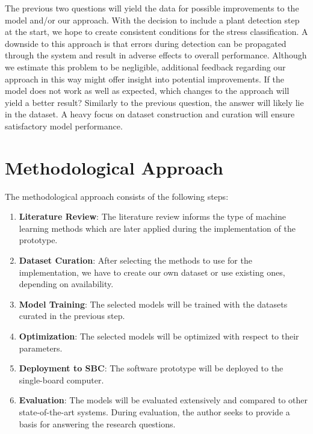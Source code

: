 \documentclass[draft,final]{vutinfth} %
\begin{document}
\begin{enumerate}
  The previous two questions will yield the data for possible
  improvements to the model and/or our approach. With the decision to
  include a plant detection step at the start, we hope to create
  consistent conditions for the stress classification. A downside to
  this approach is that errors during detection can be propagated
  through the system and result in adverse effects to overall
  performance. Although we estimate this problem to be negligible,
  additional feedback regarding our approach in this way might offer
  insight into potential improvements. If the model does not work as
  well as expected, which changes to the approach will yield a better
  result? Similarly to the previous question, the answer will likely
  lie in the dataset. A heavy focus on dataset construction and
  curation will ensure satisfactory model performance.
\end{enumerate}

\section{Methodological Approach}
\label{sec:methods}

The methodological approach consists of the following steps:

\begin{enumerate}
\item \textbf{Literature Review}: The literature review informs the
  type of machine learning methods which are later applied during the
  implementation of the prototype.
\item \textbf{Dataset Curation}: After selecting the methods to use
  for the implementation, we have to create our own dataset or use
  existing ones, depending on availability.
\item \textbf{Model Training}: The selected models will be trained
  with the datasets curated in the previous step.
\item \textbf{Optimization}: The selected models will be optimized
  with respect to their parameters.
\item \textbf{Deployment to SBC}: The software prototype will be
  deployed to the single-board computer.
\item \textbf{Evaluation}: The models will be evaluated extensively
  and compared to other state-of-the-art systems. During evaluation,
  the author seeks to provide a basis for answering the research
  questions.
\end{enumerate}
\end{document}
